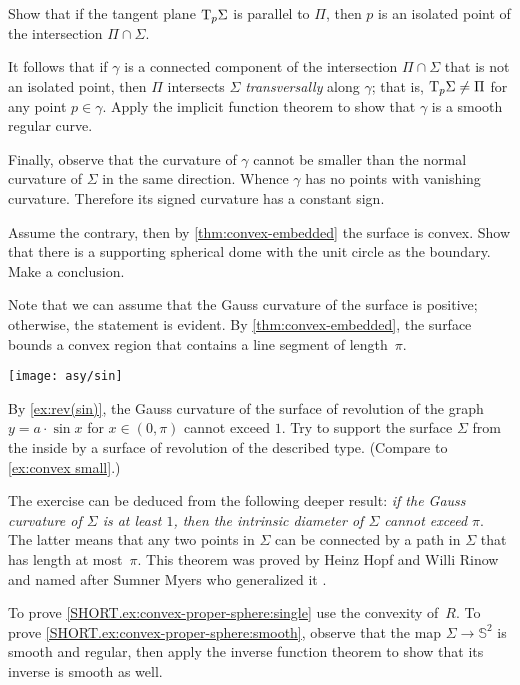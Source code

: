 \begin{multicols}{2}
Show that if the tangent plane $\mathrm{T}_p\Sigma$ is parallel to $\Pi$,
then $p$ is an isolated point of the intersection $\Pi\cap\Sigma$.

It follows that if $\gamma$ is a connected component of the intersection $\Pi\cap\Sigma$ that is not an isolated point,
then $\Pi$ intersects $\Sigma$ \emph{transversally} along $\gamma$;
that is, $\mathrm{T}_p\Sigma\ne\Pi$ for any point $p \in \gamma$.
Apply the implicit function theorem to show that $\gamma$ is a smooth regular curve.

Finally, observe that the curvature of $\gamma$ cannot be smaller than the normal curvature of $\Sigma$ in the same direction.
Whence $\gamma$ has no points with vanishing curvature.
Therefore its signed curvature has a constant sign.


Assume the contrary, then by \ref{thm:convex-embedded} the surface is convex.
Show that there is a supporting spherical dome with the unit circle as the boundary.
Make a conclusion.

Note that we can assume that the Gauss curvature of the surface is positive; otherwise, the statement is evident.
By \ref{thm:convex-embedded}, the surface bounds a convex region that contains a line segment of length~$\pi$.

\begin{Figure}
\vskip-0mm
\centering
\texttt{[image: asy/sin]}
\vskip-0mm
\end{Figure}

By \ref{ex:rev(sin)}, the Gauss curvature of the surface of revolution of the graph $y=a\cdot \sin x$ for $x\in(0,\pi)$ cannot exceed $1$.
Try to support the surface $\Sigma$ from the inside by a surface of revolution of the described type.
(Compare to \ref{ex:convex small}.)

The exercise can be deduced from the following deeper result: \textit{if the Gauss curvature of $\Sigma$ is at least $1$,
then
the intrinsic diameter of $\Sigma$ cannot exceed $\pi$}.
The latter means that any two points in $\Sigma$ can be connected by a path in $\Sigma$ that has length at most~$\pi$.
This theorem was proved by Heinz Hopf and Willi Rinow \cite{hopf-rinow} and 
named after Sumner Myers who generalized it \cite{myers}.


To prove \ref{SHORT.ex:convex-proper-sphere:single} use the convexity of~$R$.
To prove \ref{SHORT.ex:convex-proper-sphere:smooth}, observe that the map $\Sigma\to\mathbb{S}^2$ is smooth and regular, then apply the inverse function theorem to show that its inverse is smooth as well.


\end{multicols}
